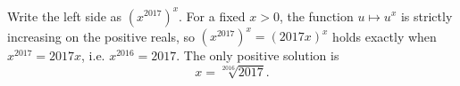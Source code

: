 Write the left side as $\left(x^{2017}\right)^x$. For a fixed $x>0$, the function $u\mapsto u^x$ is strictly increasing on the positive reals, so $\left(x^{2017}\right)^x=(2017x)^x$ holds exactly when $x^{2017}=2017x$, i.e. $x^{2016}=2017$. The only positive solution is
\[\boxed{x=\sqrt[2016]{2017}}.\]
